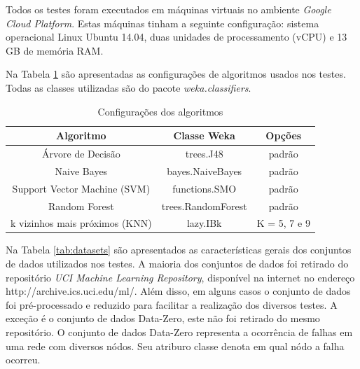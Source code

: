 Todos os testes foram executados em máquinas virtuais no ambiente \textit{Google Cloud Platform}. 
Estas máquinas tinham a seguinte configuração: sistema operacional Linux Ubuntu 14.04, duas unidades de processamento (vCPU) e 13 GB de memória RAM.

Na Tabela \ref{tab:algoritmostestes} são apresentadas as configurações de algoritmos usados nos testes. Todas as classes utilizadas são do pacote \textit{weka.classifiers}.

\begin{table}[h!]
  \begin{center}
    \begin{tabular}{ccc}
      \hline
      \textbf{Algoritmo} & \textbf{Classe Weka} & \textbf{Opções} \\
      \hline

      Árvore de Decisão & trees.J48 & padrão \\
      Naive Bayes & bayes.NaiveBayes & padrão \\
      Support Vector Machine (SVM) & functions.SMO & padrão \\
      Random Forest & trees.RandomForest & padrão \\
      k vizinhos mais próximos (KNN) & lazy.IBk & K = 5, 7 e 9 \\

      \hline
    \end{tabular}
    \caption{Configurações dos algoritmos}
    \label{tab:algoritmostestes}
  \end{center}
\end{table}

Na Tabela \ref{tab:datasets} são apresentados as características gerais dos conjuntos de dados utilizados nos testes.
A maioria dos conjuntos de dados foi retirado do repositório \textit{UCI Machine Learning Repository}, disponível na internet no endereço http://archive.ics.uci.edu/ml/.
Além disso, em alguns casos o conjunto de dados foi pré-processado e reduzido para facilitar a realização dos diversos testes.
A exceção é o conjunto de dados Data-Zero, este não foi retirado do mesmo repositório.
O conjunto de dados Data-Zero representa a ocorrência de falhas em uma rede com diversos nódos.
Seu atriburo classe denota em qual nódo a falha ocorreu.

